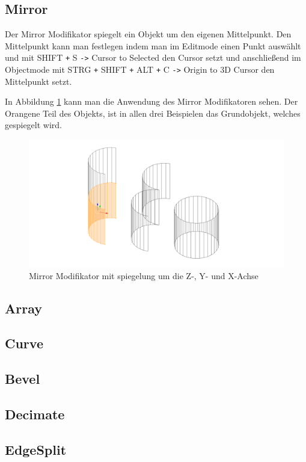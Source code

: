 \subsection{Mirror}
\citep{blender:mirror_modifier} Der Mirror Modifikator spiegelt ein Objekt um den eigenen Mittelpunkt.
Den Mittelpunkt kann man festlegen indem man im Editmode einen Punkt auswählt
und mit SHIFT \verb-+- S \verb+->+ Cursor to Selected den Cursor setzt und anschließend im Objectmode mit STRG \verb-+- SHIFT \verb-+- ALT \verb-+- C \verb+->+
Origin to 3D Cursor den Mittelpunkt setzt.

In Abbildung \ref{modifikatoren:image2} kann man die Anwendung des Mirror Modifikatoren sehen. Der Orangene Teil des Objekts, ist in allen drei Beispielen das
Grundobjekt, welches gespiegelt wird.

\begin{figure}[h]
    \centering
    \includegraphics[width=.8\textwidth]{images/Modifikatoren-Mirror.png}
    \caption{Mirror Modifikator mit spiegelung um die Z-, Y- und X-Achse}
    \label{modifikatoren:image2}
\end{figure}
\subsection{Array}
\subsection{Curve}
\subsection{Bevel}
\subsection{Decimate}
\subsection{EdgeSplit}